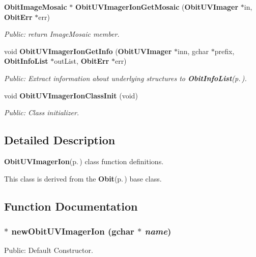 \begin{CompactItemize}
{\bf Obit\-Image\-Mosaic} $\ast$ {\bf Obit\-UVImager\-Ion\-Get\-Mosaic} ({\bf Obit\-UVImager} $\ast$in, {\bf Obit\-Err} $\ast$err)
\begin{CompactList}\small\item\em Public: return Image\-Mosaic member. \item\end{CompactList}\item 
void {\bf Obit\-UVImager\-Ion\-Get\-Info} ({\bf Obit\-UVImager} $\ast$inn, gchar $\ast$prefix, {\bf Obit\-Info\-List} $\ast$out\-List, {\bf Obit\-Err} $\ast$err)
\begin{CompactList}\small\item\em Public: Extract information about underlying structures to {\bf Obit\-Info\-List}{\rm (p.\,\pageref{structObitInfoList})}. \item\end{CompactList}\item 
void {\bf Obit\-UVImager\-Ion\-Class\-Init} (void)
\begin{CompactList}\small\item\em Public: Class initializer. \item\end{CompactList}\end{CompactItemize}


\subsection{Detailed Description}
{\bf Obit\-UVImager\-Ion}{\rm (p.\,\pageref{structObitUVImagerIon})} class function definitions. 

This class is derived from the {\bf Obit}{\rm (p.\,\pageref{structObit})} base class.

\subsection{Function Documentation}
\subsubsection{$\ast$ new\-Obit\-UVImager\-Ion (gchar $\ast$ {\em name})}\label{ObitUVImagerIon_8c_a6}


Public: Default Constructor. 

